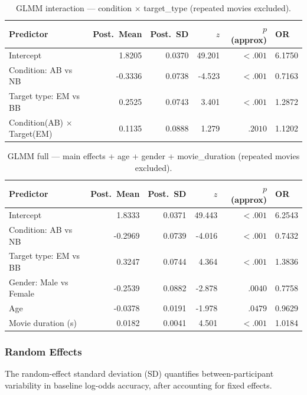 \documentclass[12pt,a4paper]{article}
\begin{document}
\begin{table}[H]
\centering
\footnotesize
\begin{tabular}{lrrrrl}
\hline
\textbf{Predictor} & \textbf{Post.\ Mean} & \textbf{Post.\ SD} & \textbf{$z$} & \textbf{$p$ (approx)} & \textbf{OR} \\
\hline
    Intercept & 1.8205 & 0.0370 & 49.201 & $<.001$ & 6.1750 \\
    Condition: AB vs NB & -0.3336 & 0.0738 & -4.523 & $<.001$ & 0.7163 \\
    Target type: EM vs BB & 0.2525 & 0.0743 & 3.401 & $<.001$ & 1.2872 \\
    Condition(AB) $\times$ Target(EM) & 0.1135 & 0.0888 & 1.279 & $.2010$ & 1.1202 \\
\hline
\end{tabular}
\caption{GLMM interaction --- condition $\times$ target\_type (repeated movies excluded).}
\label{tab:glmm_int}
\end{table}

\begin{table}[H]
\centering
\footnotesize
\begin{tabular}{lrrrrl}
\hline
\textbf{Predictor} & \textbf{Post.\ Mean} & \textbf{Post.\ SD} & \textbf{$z$} & \textbf{$p$ (approx)} & \textbf{OR} \\
\hline
    Intercept & 1.8333 & 0.0371 & 49.443 & $<.001$ & 6.2543 \\
    Condition: AB vs NB & -0.2969 & 0.0739 & -4.016 & $<.001$ & 0.7432 \\
    Target type: EM vs BB & 0.3247 & 0.0744 & 4.364 & $<.001$ & 1.3836 \\
    Gender: Male vs Female & -0.2539 & 0.0882 & -2.878 & $.0040$ & 0.7758 \\
    Age & -0.0378 & 0.0191 & -1.978 & $.0479$ & 0.9629 \\
    Movie duration (s) & 0.0182 & 0.0041 & 4.501 & $<.001$ & 1.0184 \\
\hline
\end{tabular}
\caption{GLMM full --- main effects + age + gender + movie\_duration (repeated movies excluded).}
\label{tab:glmm_full}
\end{table}


\subsubsection{Random Effects}
The random-effect standard deviation (SD) quantifies between-participant variability in
baseline log-odds accuracy, after accounting for fixed effects.
\end{document}

